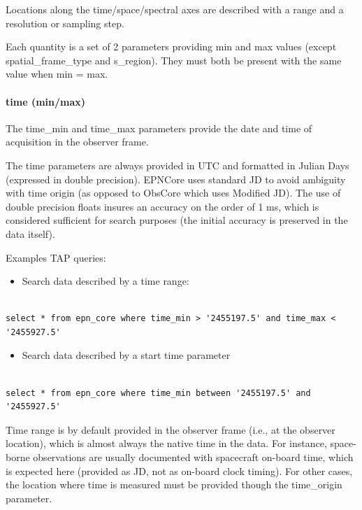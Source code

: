 \documentclass[11pt,a4paper]{ivoa}
\begin{document}
Locations along the time/space/spectral axes are described with a range and a resolution or sampling step. 

Each quantity is a set of 2 parameters providing min and max values (except spatial\_frame\_type and s\_region). They must both be present with the same value when min = max.

\paragraph{time (min/max)}

The time\_min and time\_max parameters provide the date and time of acquisition in the observer frame. 

The time parameters are always provided in UTC and formatted in Julian Days (expressed in double precision). EPNCore uses standard JD to avoid ambiguity with time origin (as opposed to ObsCore which uses Modified JD). The use of double precision floats insures an accuracy on the order of 1 ms, which is considered sufficient for search purposes (the initial accuracy is preserved in the data itself).

Examples TAP queries:

\begin{itemize}

\item Search data described by a time range:

\end{itemize}

\begin{verbatim}

select * from epn_core where time_min > '2455197.5' and time_max < '2455927.5'

\end{verbatim}

\begin{itemize}

\item Search data described by a start time parameter

\end{itemize}

\begin{verbatim}

select * from epn_core where time_min between '2455197.5' and '2455927.5'

\end{verbatim}

Time range is by default provided in the observer frame (i.e., at the observer location), which is almost always the native time in the data. For instance, space-borne observations are usually documented with spacecraft on-board time, which is expected here (provided as JD, not as on-board clock timing). For other cases, the location where time is measured must be provided though the time\_origin parameter.
\end{document}
